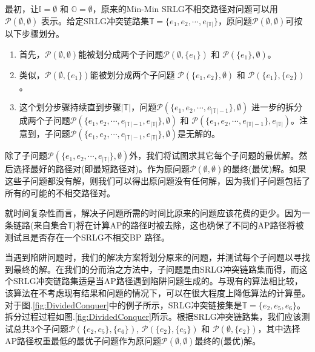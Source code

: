 最初，让$\mathbb{I}=\emptyset$ 和 ${\mathbb{O}}=\emptyset$，原来的Min-Min SRLG不相交路径对问题可以用$\mathcal{P}(\emptyset,\emptyset)$ 表示。给定SRLG冲突链路集$\mathbb{T}=\{{e_1},{e_2}, \cdots ,{e_{\left| \mathbb{T} \right|}}\}$，原问题$\mathcal{P}(\emptyset,\emptyset)$可按以下步骤划分。

\begin{enumerate}
  \item 首先，$\mathcal{P}(\emptyset,\emptyset)$能被划分成两个子问题$\mathcal{P}(\emptyset,\{e_1\})$ 和 $\mathcal{P}(\{e_1\},\emptyset)$。
  \item 类似，$\mathcal{P}(\emptyset,\{e_1\})$能被划分成两个子问题 $\mathcal{P}(\{e_1,e_2\},\emptyset)$ 和 $\mathcal{P}(\{e_1\},\{e_2\})$。
  \item 这个划分步骤持续直到步骤$|\mathbb{T}|$，问题$\mathcal{P}(\{e_1,e_2,\cdots ,{e_{\left| \mathbb{T} \right|-1}}\},\emptyset)$ 进一步的拆分成两个子问题$\mathcal{P}(\{e_1,e_2,\cdots ,{e_{\left| \mathbb{T} \right|-1}}, {e_{\left| \mathbb{T} \right|}}\},\emptyset)$ 和 $\mathcal{P}(\{e_1,e_2,\cdots ,{e_{\left| \mathbb{T} \right|-1}}\},{e_{\left| \mathbb{T} \right|}})$。注意到，子问题$\mathcal{P}(\{e_1,e_2,\cdots ,{e_{\left| \mathbb{T} \right|-1}}, {e_{\left| \mathbb{T} \right|}}\},\emptyset)$是无解的。
\end{enumerate}



除了子问题$\mathcal{P}(\{e_1,e_2,\cdots ,{e_{\left| \mathbb{T} \right|}}\},\emptyset)$外，我们将试图求其它每个子问题的最优解。然后选择最好的路径对(即最短路径对)。作为原问题$\mathcal{P}(\emptyset,\emptyset)$的最终(最优)解。如果这些子问题都没有解，则我们可以得出原问题没有任何解，因为我们子问题包括了所有的可能的不相交路径对。

就时间复杂性而言，解决子问题所需的时间比原来的问题应该花费的更少。因为一条链路(来自集合$\mathbb{T}$)将在计算AP的路径时被去除，这也确保了不同的AP路径将被测试且是否存在一个SRLG不相交BP 路径。

当遇到陷阱问题时，我们的解决方案将划分原来的问题，并测试每个子问题以寻找到最终的解。在我们的分而治之方法中，子问题是由SRLG冲突链路集而得，而这个SRLG冲突链路集适是当AP路径遇到陷阱问题生成的。与现有的算法相比较，该算法在不考虑现有结果和问题的情况下，可以在很大程度上降低算法的计算量。对于图.\ref{fig:DividedConquer}中的例子所示，SRLG冲突链接集是$\mathbb{T}=\{e_2,e_5,e_6\}$。拆分过程过程如图.\ref{fig:DividedConquer}所示。根据SRLG冲突链路集，我们应该测试总共3个子问题${{\mathcal{P}}(\{ e_2,e_5\} ,\{ e_6\} )}$, ${{\mathcal{P}}(\{ e_2\} ,\{ e_5\} )}$ 和 ${{\mathcal{P}}(\emptyset ,\{ e_2\} )}$，其中选择AP路径权重最低的最优子问题作为原问题$\mathcal{P}(\emptyset,\emptyset)$最终的(最优)解。

